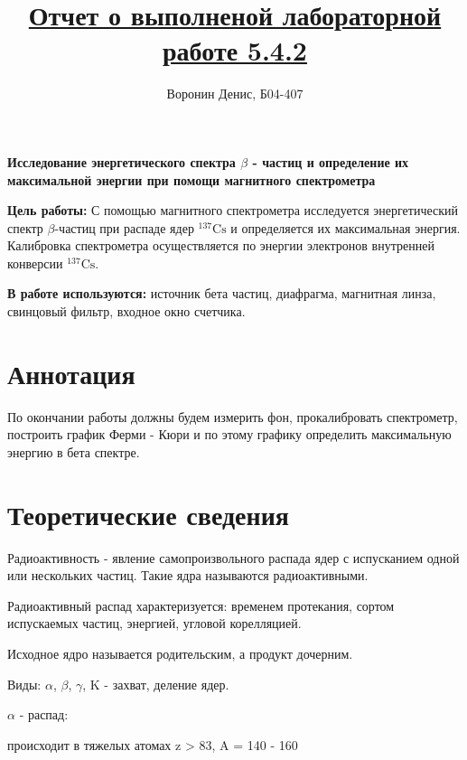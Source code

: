 \documentclass[a4paper]{article}
\title{\underline{Отчет о выполненой лабораторной работе 5.4.2}}
\author{Воронин Денис, Б04-407}
\begin{document}
\maketitle

\begin{center}
\textbf{\Large Исследование энергетического спектра $\beta$ - частиц и определение их максимальной энергии при помощи магнитного спектрометра}
\end{center}

\textbf{Цель работы:} С помощью магнитного спектрометра исследуется энергетический спектр $\beta$-частиц при распаде ядер ${}^{137}\mathrm{Cs}$ и определяется их максимальная энергия. Калибровка спектрометра осуществляется по энергии электронов внутренней конверсии ${}^{137}\mathrm{Cs}$.

\textbf{В работе используются:} источник бета частиц, диафрагма, магнитная линза, свинцовый фильтр, входное окно счетчика.

\section{Аннотация}

По окончании работы должны будем измерить фон, прокалибровать спектрометр, построить график Ферми - Кюри и по этому графику определить максимальную энергию в бета спектре.

\section{Теоретические сведения}

Радиоактивность - явление самопроизвольного распада ядер с испусканием одной или нескольких частиц. Такие ядра называются радиоактивными. \par

Радиоактивный распад характеризуется: временем протекания, сортом испускаемых частиц, энергией, угловой корелляцией. \par

Исходное ядро называется родительским, а продукт дочерним. \par

Виды: $\alpha$, $\beta$, $\gamma$, K - захват, деление ядер.\par

$\textbf{$\alpha$ - распад}$: \par

происходит в тяжелых атомах z > 83, A = 140 - 160 \par
\end{document}
